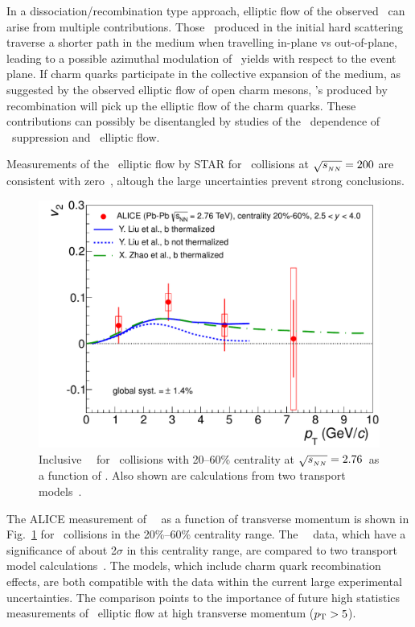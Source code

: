 In a dissociation/recombination type approach, elliptic flow of the observed \jpsi\ can arise from multiple 
contributions. Those \jpsi\ produced in the initial hard scattering traverse a shorter path in the medium when 
travelling in-plane vs out-of-plane, leading to a possible azimuthal modulation of \jpsi\ yields with respect
to the event plane. If charm quarks participate in the collective expansion of the medium, as 
suggested by the observed elliptic flow of open charm mesons, \jpsi's produced by recombination will 
pick up the elliptic flow of the charm quarks. These contributions can possibly be disentangled by 
studies of the \pT\ dependence of \jpsi\ suppression and \jpsi\ elliptic flow.

Measurements of the \jpsi\ elliptic flow by STAR for \AuAu\ collisions at $\sqrt{s_{_{NN}}} = 200$\GeV 
are consistent with zero~\cite{Adamczyk:2012pw}, altough the large uncertainties prevent strong conclusions.
\begin{figure}
\begin{center}
\includegraphics[width=0.49\linewidth]{qqbarfigures/prl_fig4-eps-converted-to.pdf}
\caption{\label{fig:GR:v2ptcomp} Inclusive \jpsi\ \vtwo\  
for \PbPb\ collisions with 20--60\% centrality at $\sqrt{s_{_{NN}}} = 2.76$\TeV\ as a function of \pT. 
Also shown are calculations from two transport models~\cite{Liu:2009gx,Zhao:2012gc}.}
\end{center}
\end{figure}
The ALICE measurement of \jpsi\ \vtwo\ as a function of transverse momentum is shown in Fig.~\ref{fig:GR:v2ptcomp} for \PbPb\ collisions
in the 20\%--60\% centrality range.
The \jpsi\ \vtwo\ data, which have a significance of about 2$\sigma$ in this centrality range, are compared to two 
transport model calculations~\cite{Liu:2009gx,Zhao:2012gc}. The models, which include charm quark recombination effects, 
are both compatible with the data within the current large experimental uncertainties. The comparison points to the 
importance of future high statistics measurements of \jpsi\ elliptic flow at high transverse momentum ($\mbox{$p_{\mathrm{T}}$} > 5$\GeVc).

